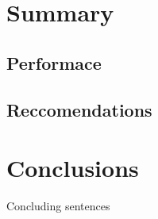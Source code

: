 \documentclass[12pt]{article}
\begin{document}
\section{Summary}
  \subsection{Performace}
  \subsection{Reccomendations}
\section{Conclusions}
  Concluding sentences
\end{document}
